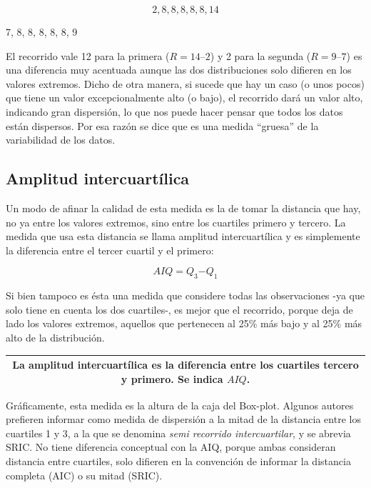 \documentclass[]{book}
\begin{document}
\[2, 8, 8, 8, 8, 8, 14\]

7, 8, 8, 8, 8, 8, 9

El recorrido vale 12 para la primera (\(R=14–2\)) y 2 para la segunda
(\(R=9–7\)) es una diferencia muy acentuada aunque las dos distribuciones
solo difieren en los valores extremos. Dicho de otra manera, si sucede
que hay un caso (o unos pocos) que tiene un valor excepcionalmente alto
(o bajo), el recorrido dará un valor alto, indicando gran dispersión, lo
que nos puede hacer pensar que todos los datos están dispersos. Por esa
razón se dice que es una medida ``gruesa'' de la variabilidad de los
datos.

\hypertarget{amplitud-intercuartilica}{%
\subsection{Amplitud intercuartílica}\label{amplitud-intercuartilica}}

Un modo de afinar la calidad de esta medida es la de tomar la distancia
que hay, no ya entre los valores extremos, sino entre los cuartiles
primero y tercero. La medida que usa esta distancia se llama amplitud
intercuartílica y es simplemente la diferencia entre el tercer cuartil y
el primero:

\[AIQ = Q_{3}{- Q}_{1}\]

Si bien tampoco es ésta una medida que considere todas las observaciones
-ya que solo tiene en cuenta los dos cuartiles-, es mejor que el
recorrido, porque deja de lado los valores extremos, aquellos que
pertenecen al 25\% más bajo y al 25\% más alto de la distribución.

\begin{longtable}[]{@{}c@{}}
\toprule
\endhead
\begin{minipage}[t]{0.97\columnwidth}\centering
La \textbf{amplitud intercuartílica} es la diferencia entre los cuartiles tercero y primero. Se indica \(AIQ\).\strut
\end{minipage}\tabularnewline
\bottomrule
\end{longtable}

Gráficamente, esta medida es la altura de la caja del Box-plot. Algunos autores prefieren informar como medida de dispersión a la mitad de la distancia entre los cuartiles 1 y 3, a la que se denomina \emph{semi recorrido intercuartilar}, y se abrevia SRIC. No tiene diferencia conceptual con la AIQ, porque ambas consideran distancia entre cuartiles, solo difieren en la convención de informar la distancia completa (AIC) o su mitad (SRIC).
\end{document}
